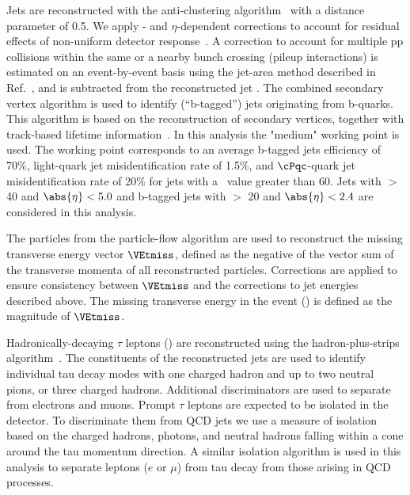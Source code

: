 Jets are reconstructed with the anti-\kt clustering
algorithm~\cite{Cacciari:2008gp} with a distance parameter of 0.5. We apply
\pt- and $\eta$-dependent corrections to account for residual
effects of non-uniform detector response~\cite{Chatrchyan:2011ds}.
A correction to account for multiple pp collisions within the same or a nearby
bunch crossing (pileup interactions) is estimated on an event-by-event basis using the
jet-area method described in Ref.~\cite{Cacciari:2007fd}, and is
subtracted from the reconstructed jet \pt.
The combined secondary vertex algorithm is used to identify (``b-tagged'') jets 
originating from b-quarks.  This algorithm 
 is based on the reconstruction of secondary vertices, together with track-based lifetime information~\cite{Chatrchyan:2012jua}. 
In this analysis the "medium" working point is used. The working point corresponds to an average b-tagged jets efficiency of 70\%, 
light-quark jet misidentification rate of 1.5\%, and $\cPqc$-quark jet misidentification rate of 20\% 
for jets with a \pt\ value greater than 60\GeV.
Jets with  \PT $>$ 40 \GeV and $\abs{\eta} < 5.0$ and b-tagged jets with \PT $>$ 20 \GeV and $\abs{\eta} < 2.4$ are considered in this analysis.


The particles from the particle-flow algorithm are used to reconstruct the missing transverse energy vector $\VEtmiss$, defined as the negative of the vector sum of the transverse momenta of all reconstructed particles.  Corrections are applied to ensure consistency between
$\VEtmiss$ and the corrections to jet energies described above.  The missing transverse energy in the event (\MPT) is defined as the magnitude of $\VEtmiss$.



Hadronically-decaying $\tau$ leptons (\Tau) are reconstructed using the hadron-plus-strips algorithm~\cite{Khachatryan:2015dfa}. The constituents of the reconstructed jets are used to identify individual tau decay modes with one charged hadron and up to two neutral pions, or three charged hadrons. 
Additional discriminators are used to separate \Tau from electrons and muons.
Prompt $\tau$ leptons are expected to be isolated in the detector.
To discriminate them from QCD jets we use a measure of isolation 
based on the charged hadrons, photons, and neutral hadrons falling within 
a cone around the tau momentum direction.  A similar isolation algorithm is 
used in this analysis to separate leptons ($e$ or $\mu$) from tau decay from 
those arising in QCD processes.







